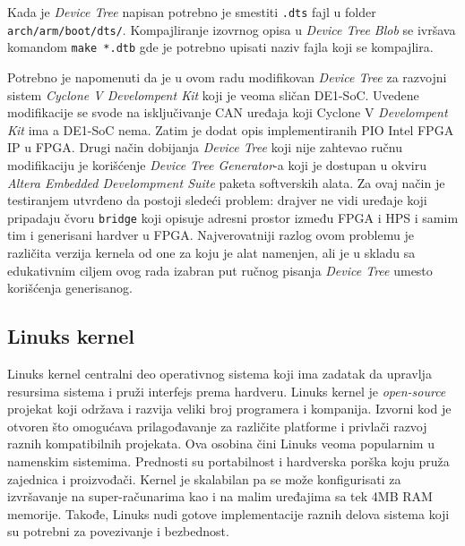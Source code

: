 Kada je \textit{Device Tree} napisan potrebno je smestiti \texttt{.dts} fajl u folder \texttt{arch/arm/boot/dts/}. Kompajliranje izovrnog opisa u \textit{Device Tree Blob} se ivršava komandom \texttt{make *.dtb} gde je potrebno upisati naziv fajla koji se kompajlira.

Potrebno je napomenuti da je u ovom radu modifikovan \textit{Device Tree} za razvojni sistem \textit{Cyclone V Develompent Kit} koji je veoma sličan DE1-SoC. Uvedene modifikacije se svode na isključivanje CAN uređaja koji Cyclone V \textit{Develompent Kit} ima a DE1-SoC nema. Zatim je dodat opis implementiranih PIO Intel FPGA IP u FPGA. Drugi način dobijanja \textit{Device Tree} koji nije zahtevao ručnu modifikaciju je korišćenje \textit{Device Tree Generator}-a koji je dostupan u okviru \textit{Altera Embedded Develompment Suite} paketa softverskih alata. Za ovaj način je testiranjem utvrđeno da postoji sledeći problem: drajver ne vidi uređaje koji pripadaju čvoru \texttt{bridge} koji opisuje adresni prostor između FPGA i HPS i samim tim i generisani hardver u FPGA. Najverovatniji razlog ovom problemu je različita verzija kernela od one za koju je alat namenjen, ali je u skladu sa edukativnim ciljem ovog rada izabran put ručnog pisanja \textit{Device Tree} umesto korišćenja generisanog.

\subsection{Linuks kernel}
Linuks kernel centralni deo operativnog sistema koji ima zadatak da upravlja resursima sistema i pruži interfejs prema hardveru. Linuks kernel je \textit{open-source} projekat koji održava i razvija veliki broj programera i kompanija. Izvorni kod je otvoren što omogućava prilagođavanje za različite platforme i privlači razvoj raznih kompatibilnih projekata. Ova osobina čini Linuks veoma popularnim u namenskim sistemima. Prednosti su portabilnost i hardverska porška koju pruža zajednica i proizvođači. Kernel je skalabilan pa se može konfigurisati za izvršavanje na super-računarima kao i na malim uređajima sa tek 4MB RAM memorije. Takođe, Linuks nudi gotove implementacije raznih delova sistema koji su potrebni za povezivanje i bezbednost.


